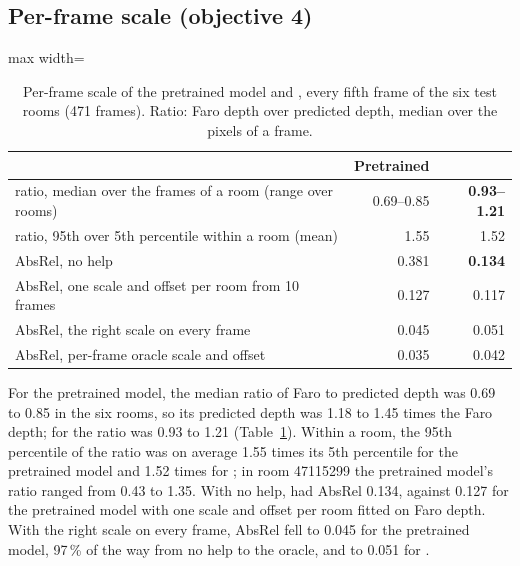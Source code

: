 \subsection{Per-frame scale (objective 4)}\label{sec:scale}
\begin{table}[t]
\centering\small
\caption{Per-frame scale of the pretrained model and \ftmain{}, every fifth frame of the six test rooms (471 frames).
Ratio: Faro depth over predicted depth, median over the pixels of a frame.}
\label{tab:scale}
\begin{adjustbox}{max width=\columnwidth}
\begin{tabular}{@{}lrr@{}}
\toprule
 & Pretrained & \textbf{\ftmain{}} \\
\midrule
ratio, median over the frames of a room (range over rooms) & 0.69--0.85 & \textbf{0.93--1.21} \\
ratio, 95th over 5th percentile within a room (mean) & 1.55 & 1.52 \\
AbsRel, no help & 0.381 & \textbf{0.134} \\
AbsRel, one scale and offset per room from 10 frames & 0.127 & 0.117 \\
AbsRel, the right scale on every frame & 0.045 & 0.051 \\
AbsRel, per-frame oracle scale and offset & 0.035 & 0.042 \\
\bottomrule
\end{tabular}
\end{adjustbox}
\end{table}

For the pretrained model, the median ratio of Faro to predicted depth was 0.69 to 0.85 in the six rooms, so its
predicted depth was 1.18 to 1.45 times the Faro depth; for \ftmain{} the ratio was 0.93 to 1.21
(Table~\ref{tab:scale}). Within a room, the 95th percentile of the ratio was on average 1.55 times its 5th percentile
for the pretrained model and 1.52 times for \ftmain{}; in room 47115299 the pretrained model's ratio ranged from 0.43 to
1.35. With no help, \ftmain{} had AbsRel 0.134, against 0.127 for the pretrained model with one scale and offset per
room fitted on Faro depth. With the right scale on every frame, AbsRel fell to 0.045 for the pretrained model, 97\,\%
of the way from no help to the oracle, and to 0.051 for \ftmain{}.

